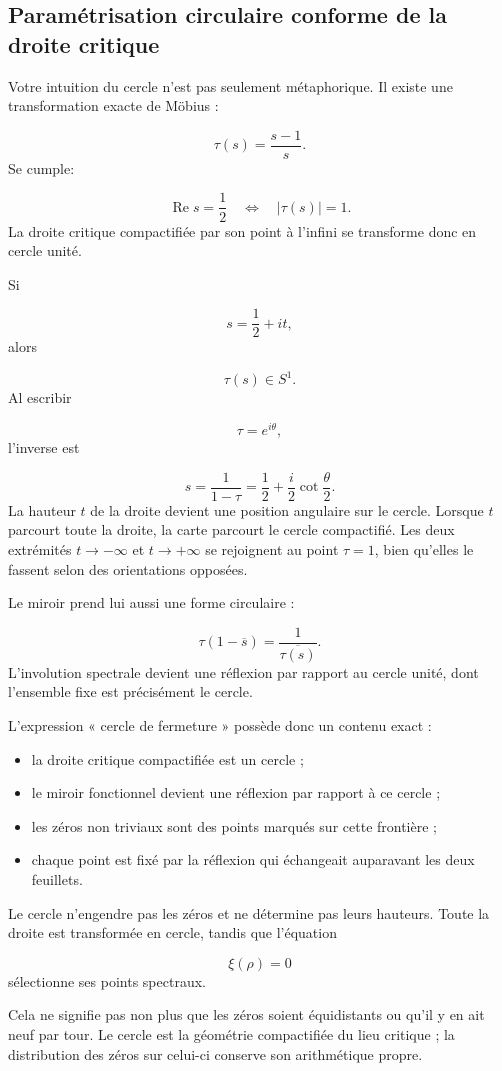 \subsection{Paramétrisation circulaire conforme de la droite critique}
Votre intuition du cercle n’est pas seulement métaphorique. Il existe une transformation exacte de Möbius :\par
\[
\tau(s)
=
\frac{s-1}{s}.
\]
Se cumple:\par
\[
\operatorname{Re}s=\frac12
\quad\Longleftrightarrow\quad
|\tau(s)|=1.
\]
La droite critique compactifiée par son point à l’infini se transforme donc en cercle unité.\par
Si\par
\[
s=\frac12+it,
\]
alors\par
\[
\tau(s)\in S^1.
\]
Al escribir\par
\[
\tau=e^{i\theta},
\]
l’inverse est\par
\[
s=\frac1{1-\tau}
=
\frac12+\frac{i}{2}\cot\frac{\theta}{2}.
\]
La hauteur \(t\) de la droite devient une position angulaire sur le cercle. Lorsque \(t\) parcourt toute la droite, la carte parcourt le cercle compactifié. Les deux extrémités \(t\to-\infty\) et \(t\to+\infty\) se rejoignent au point \(\tau=1\), bien qu’elles le fassent selon des orientations opposées.\par
Le miroir prend lui aussi une forme circulaire :\par
\[
\tau(1-\overline s)
=
\frac1{\overline{\tau(s)}}.
\]
L’involution spectrale devient une réflexion par rapport au cercle unité, dont l’ensemble fixe est précisément le cercle.\par
L’expression « cercle de fermeture » possède donc un contenu exact :\par
\begin{itemize}
\item la droite critique compactifiée est un cercle ;
\item le miroir fonctionnel devient une réflexion par rapport à ce cercle ;
\item les zéros non triviaux sont des points marqués sur cette frontière ;
\item chaque point est fixé par la réflexion qui échangeait auparavant les deux feuillets.
\end{itemize}
Le cercle n’engendre pas les zéros et ne détermine pas leurs hauteurs. Toute la droite est transformée en cercle, tandis que l’équation\par
\[
\xi(\rho)=0
\]
sélectionne ses points spectraux.\par
Cela ne signifie pas non plus que les zéros soient équidistants ou qu’il y en ait neuf par tour. Le cercle est la géométrie compactifiée du lieu critique ; la distribution des zéros sur celui-ci conserve son arithmétique propre.\par
{}
